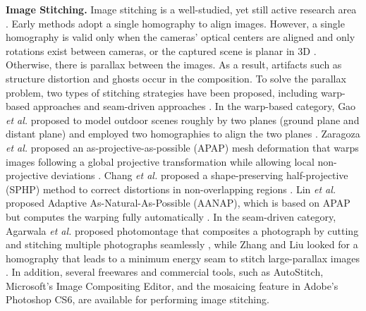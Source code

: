 \documentclass[conference]{IEEEtran}
\begin{document}
{\bf Image Stitching.} Image stitching is a well-studied, yet still active research 
area \cite{paragios2006handbook, brown2007automatic,hartley2003multiple,lin2011smoothly, chang2014shape, zaragoza2013projective,lin2015adaptive,zhang2014parallax, gao2013seam, agarwala2004interactive,gao2011constructing}. 
Early methods adopt a single homography to align images.
However, a single homography is valid only when the cameras' optical centers are aligned and only rotations exist between cameras, or the captured scene is planar in 3D \cite{hartley2003multiple}. 
Otherwise, there is parallax between the images. As a result, artifacts such as structure distortion and ghosts occur in the composition. 
To solve the parallax problem, two types of stitching strategies have been proposed, including warp-based approaches \cite{lin2011smoothly, chang2014shape, zaragoza2013projective} and seam-driven approaches \cite{zhang2014parallax, gao2013seam, agarwala2004interactive}. 
In the warp-based category, 
Gao \textit{et al.} proposed to model outdoor scenes roughly by two planes (ground plane and distant plane) and employed two homographies to align the two planes \cite{gao2011constructing}.
Zaragoza \textit{et al.} proposed an as-projective-as-possible (APAP) mesh deformation that warps
images following a global projective transformation while allowing local non-projective 
deviations \cite{zaragoza2013projective}.
Chang \textit{et al.} proposed a shape-preserving half-projective (SPHP) method
to correct distortions in non-overlapping regions \cite{chang2014shape}. 
Lin \textit{et al.} proposed Adaptive As-Natural-As-Possible (AANAP), 
which is based on APAP but computes the warping fully automatically \cite{lin2015adaptive}.
In the seam-driven category, Agarwala \textit{et al.}
proposed photomontage that composites a photograph by
cutting and stitching multiple photographs seamlessly \cite{agarwala2004interactive},
while Zhang and Liu looked for a homography that leads to a
minimum energy seam to stitch large-parallax images \cite{zhang2014parallax}.
In addition, several freewares and commercial tools, such as AutoStitch, Microsoft’s Image Compositing Editor, and the mosaicing feature in Adobe's Photoshop CS6, are available for performing image stitching.
\end{document}
